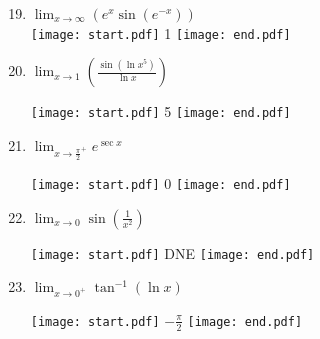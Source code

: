\documentclass[12pt]{article}
\begin{document}

\begin{enumerate}
\setcounter{enumi}{18}

\item $\displaystyle \lim_{x\rightarrow \infty}{\left(e^x \sin {(e^{-x})}\right)}$\\

\texttt{[image: start.pdf]}
{{1}}
\texttt{[image: end.pdf]}


\item $\displaystyle \lim_{x\rightarrow 1}{\left(\frac{\sin{(\ln x^5)}}{\ln x}\right)}$ 

\texttt{[image: start.pdf]}
{{5}}
\texttt{[image: end.pdf]}


\item $\displaystyle \lim_{x \rightarrow \frac{\pi}{2}^+}{e^{\sec{x}}}$

\texttt{[image: start.pdf]}
{{0}}
\texttt{[image: end.pdf]}


\item $\displaystyle \lim_{x \rightarrow 0}{\sin{\left(\frac{1}{x^2}\right)}}$

\texttt{[image: start.pdf]}
{{DNE}}
\texttt{[image: end.pdf]}


\item $\displaystyle \lim_{x \rightarrow 0^+}{\tan^{-1}{(\ln{x})}}$

\texttt{[image: start.pdf]}
{{$\displaystyle -\frac{\pi}{2}$}}
\texttt{[image: end.pdf]}


\end{enumerate}

\end{document}
